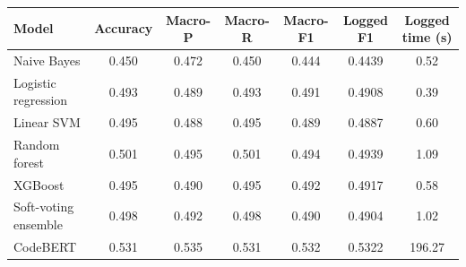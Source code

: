 \begin{tabular*}{\tblwidth}{@{\extracolsep{\fill}} lcccccc @{}}
\toprule
Model & Accuracy & Macro-P & Macro-R & Macro-F1 & Logged F1 & Logged time (s) \\
\midrule
Naive Bayes & 0.450 & 0.472 & 0.450 & 0.444 & 0.4439 & 0.52 \\
Logistic regression & 0.493 & 0.489 & 0.493 & 0.491 & 0.4908 & 0.39 \\
Linear SVM & 0.495 & 0.488 & 0.495 & 0.489 & 0.4887 & 0.60 \\
Random forest & 0.501 & 0.495 & 0.501 & 0.494 & 0.4939 & 1.09 \\
XGBoost & 0.495 & 0.490 & 0.495 & 0.492 & 0.4917 & 0.58 \\
Soft-voting ensemble & 0.498 & 0.492 & 0.498 & 0.490 & 0.4904 & 1.02 \\
CodeBERT & 0.531 & 0.535 & 0.531 & 0.532 & 0.5322 & 196.27 \\
\bottomrule
\end{tabular*}
